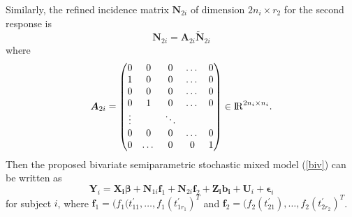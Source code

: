 \documentclass[article,lineno]{biometrika}
\begin{document}
 Similarly, the refined incidence matrix $\boldsymbol N_{2i}$ of dimension $2n_i \times r_2$ for the second response is 
$$
\boldsymbol N_{2i} = \boldsymbol A_{2i} \boldsymbol {\tilde N}_{2i}
$$
 where 
\[
\boldsymbol A_{2i} =
  \begin{pmatrix}
 0 & 0 & 0 &   \dots & 0 \\
1 & 0 & 0 &  \dots & 0 \\
 0 & 0 & 0 &   \dots & 0\\
0 & 1 & 0 & \dots & 0\\
  \vdots &  & \ddots &  \\ 
0 & 0 & 0 &   \dots & 0\\
0 & \dots & 0  & 0 & 1 \\
 \end{pmatrix}
  \in {\rm I\!R}^{2n_i \times n_i}.
 \]
Then the proposed bivariate semiparametric stochastic mixed model  (\ref{biv}) can be written as
$$
\boldsymbol Y_{i} 
=
\boldsymbol{X_{i}}\boldsymbol{\beta} +
 \boldsymbol N_{1i} \boldsymbol f_1 + 
  \boldsymbol N_{2i} \boldsymbol f_2 + 
\boldsymbol{Z_{i}}\boldsymbol{b_{i}} + 
\boldsymbol U_{i} + 
\boldsymbol \epsilon_{i}
$$
for subject $i$, where 
$\bm f_1 = (f_1(t_{11}^\prime, \dots, f_1(t_{1r_1}^\prime)^T$
and 
$\bm f_2 = (f_2(t_{21}^\prime), \dots, f_2(t_{2r_2}^\prime)^T$.

\end{document}
